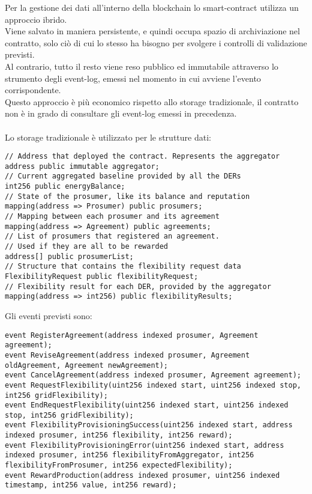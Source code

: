 Per la gestione dei dati all'interno della blockchain lo \gls{smart-contract} utilizza un approccio ibrido. \\
Viene salvato in maniera persistente, e quindi occupa spazio di archiviazione nel contratto, solo ciò di cui lo stesso ha bisogno per
svolgere i controlli di validazione previsti. \\
Al contrario, tutto il resto viene reso pubblico ed immutabile attraverso lo strumento degli \gls{event-log},
emessi nel momento in cui avviene l'evento corrispondente. \\
Questo approccio è più economico rispetto allo storage tradizionale, il contratto non è in grado di consultare gli \gls{event-log} emessi in precedenza. \\
\\
Lo storage tradizionale è utilizzato per le strutture dati:
\begin{verbatim}
// Address that deployed the contract. Represents the aggregator
address public immutable aggregator;
// Current aggregated baseline provided by all the DERs 
int256 public energyBalance;
// State of the prosumer, like its balance and reputation
mapping(address => Prosumer) public prosumers;
// Mapping between each prosumer and its agreement
mapping(address => Agreement) public agreements;
// List of prosumers that registered an agreement. 
// Used if they are all to be rewarded
address[] public prosumerList;
// Structure that contains the flexibility request data
FlexibilityRequest public flexibilityRequest;
// Flexibility result for each DER, provided by the aggregator
mapping(address => int256) public flexibilityResults;
\end{verbatim}

Gli eventi previsti sono:
\begin{verbatim}
event RegisterAgreement(address indexed prosumer, Agreement agreement);
event ReviseAgreement(address indexed prosumer, Agreement oldAgreement, Agreement newAgreement);
event CancelAgreement(address indexed prosumer, Agreement agreement);
event RequestFlexibility(uint256 indexed start, uint256 indexed stop, int256 gridFlexibility);
event EndRequestFlexibility(uint256 indexed start, uint256 indexed stop, int256 gridFlexibility);
event FlexibilityProvisioningSuccess(uint256 indexed start, address indexed prosumer, int256 flexibility, int256 reward);
event FlexibilityProvisioningError(uint256 indexed start, address indexed prosumer, int256 flexibilityFromAggregator, int256 flexibilityFromProsumer, int256 expectedFlexibility);
event RewardProduction(address indexed prosumer, uint256 indexed timestamp, int256 value, int256 reward);
\end{verbatim}


